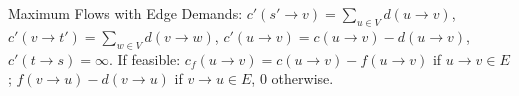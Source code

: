 \begin{minipage}[t]{.47\textwidth}
Maximum Flows with Edge Demands: $\displaystyle c'(s'\rightarrow v)=\sum_{u\in V}d(u\rightarrow v)$, $\displaystyle c'(v\rightarrow t')=\sum_{w\in V}d(v\rightarrow w)$, $\displaystyle c'(u\rightarrow v)=c(u\rightarrow v)-d(u\rightarrow v)$, $\displaystyle c'(t\rightarrow s)=\infty$.
If feasible: $c_f(u\rightarrow v)=c(u\rightarrow v)-f(u\rightarrow v)$ if $u\rightarrow v\in E$; $f(v\rightarrow u)-d(v\rightarrow u)$ if $v\rightarrow u\in E$, $0$ otherwise.
\end{minipage}